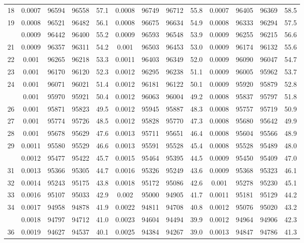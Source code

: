 \documentclass[
  14pt,
]{article}
\begin{document}
\begin{longtable}[t]{lcccccccccccc}
18 & 0.0007 & 96594 & 96558 & 57.1 & 0.0008 & 96749 & 96712 & 55.8 & 0.0007 & 96405 & 96369 & 58.5\\
19 & 0.0008 & 96521 & 96482 & 56.1 & 0.0008 & 96675 & 96634 & 54.9 & 0.0008 & 96333 & 96294 & 57.5\\
\addlinespace
20 & 0.0009 & 96442 & 96400 & 55.2 & 0.0009 & 96593 & 96548 & 53.9 & 0.0009 & 96255 & 96215 & 56.6\\
21 & 0.0009 & 96357 & 96311 & 54.2 & 0.001 & 96503 & 96453 & 53.0 & 0.0009 & 96174 & 96132 & 55.6\\
22 & 0.001 & 96265 & 96218 & 53.3 & 0.0011 & 96403 & 96349 & 52.0 & 0.0009 & 96090 & 96047 & 54.7\\
23 & 0.001 & 96170 & 96120 & 52.3 & 0.0012 & 96295 & 96238 & 51.1 & 0.0009 & 96005 & 95962 & 53.7\\
24 & 0.001 & 96071 & 96021 & 51.4 & 0.0012 & 96181 & 96122 & 50.1 & 0.0009 & 95920 & 95879 & 52.8\\
\addlinespace
25 & 0.001 & 95970 & 95921 & 50.4 & 0.0012 & 96063 & 96004 & 49.2 & 0.0008 & 95837 & 95797 & 51.8\\
26 & 0.001 & 95871 & 95823 & 49.5 & 0.0012 & 95945 & 95887 & 48.3 & 0.0008 & 95757 & 95719 & 50.9\\
27 & 0.001 & 95774 & 95726 & 48.5 & 0.0012 & 95828 & 95770 & 47.3 & 0.0008 & 95680 & 95642 & 49.9\\
28 & 0.001 & 95678 & 95629 & 47.6 & 0.0013 & 95711 & 95651 & 46.4 & 0.0008 & 95604 & 95566 & 48.9\\
29 & 0.0011 & 95580 & 95529 & 46.6 & 0.0013 & 95591 & 95528 & 45.4 & 0.0008 & 95528 & 95489 & 48.0\\
\addlinespace
30 & 0.0012 & 95477 & 95422 & 45.7 & 0.0015 & 95464 & 95395 & 44.5 & 0.0009 & 95450 & 95409 & 47.0\\
31 & 0.0013 & 95366 & 95305 & 44.7 & 0.0016 & 95326 & 95249 & 43.6 & 0.0009 & 95368 & 95323 & 46.1\\
32 & 0.0014 & 95243 & 95175 & 43.8 & 0.0018 & 95172 & 95086 & 42.6 & 0.001 & 95278 & 95230 & 45.1\\
33 & 0.0016 & 95107 & 95033 & 42.9 & 0.002 & 95000 & 94905 & 41.7 & 0.0011 & 95181 & 95129 & 44.2\\
34 & 0.0017 & 94958 & 94878 & 41.9 & 0.0022 & 94811 & 94708 & 40.8 & 0.0012 & 95076 & 95020 & 43.2\\
\addlinespace
35 & 0.0018 & 94797 & 94712 & 41.0 & 0.0023 & 94604 & 94494 & 39.9 & 0.0012 & 94964 & 94906 & 42.3\\
36 & 0.0019 & 94627 & 94537 & 40.1 & 0.0025 & 94384 & 94267 & 39.0 & 0.0013 & 94847 & 94786 & 41.3\\

\end{longtable}
\end{document}

